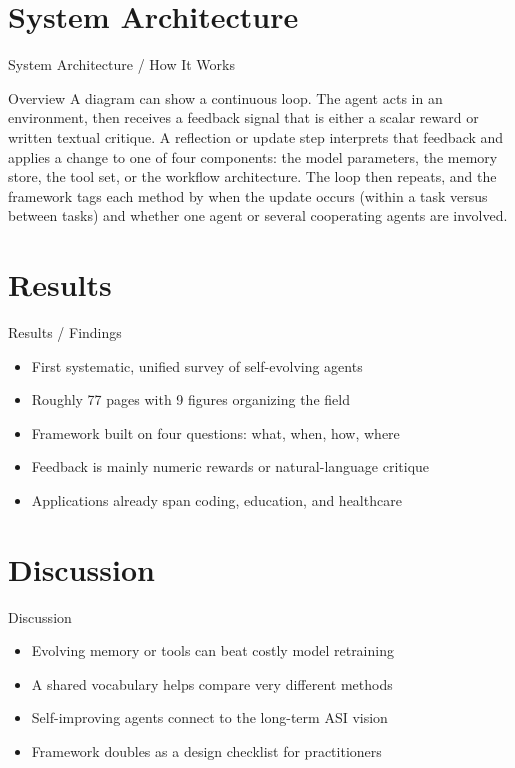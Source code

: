 \documentclass[10pt]{beamer}
\begin{document}
\section{System Architecture}
\begin{frame}{System Architecture / How It Works}
  \begin{block}{Overview}
  A diagram can show a continuous loop. The agent acts in an environment, then receives a feedback signal that is either a scalar reward or written textual critique. A reflection or update step interprets that feedback and applies a change to one of four components: the model parameters, the memory store, the tool set, or the workflow architecture. The loop then repeats, and the framework tags each method by when the update occurs (within a task versus between tasks) and whether one agent or several cooperating agents are involved.
  \end{block}
\end{frame}

\section{Results}
\begin{frame}[allowframebreaks]{Results / Findings}
\begin{itemize}
  \item First systematic, unified survey of self-evolving agents
  \item Roughly 77 pages with 9 figures organizing the field
  \item Framework built on four questions: what, when, how, where
  \item Feedback is mainly numeric rewards or natural-language critique
  \item Applications already span coding, education, and healthcare
\end{itemize}
\end{frame}

\section{Discussion}
\begin{frame}{Discussion}
\begin{itemize}
  \item Evolving memory or tools can beat costly model retraining
  \item A shared vocabulary helps compare very different methods
  \item Self-improving agents connect to the long-term ASI vision
  \item Framework doubles as a design checklist for practitioners
\end{itemize}
\end{frame}
\end{document}
